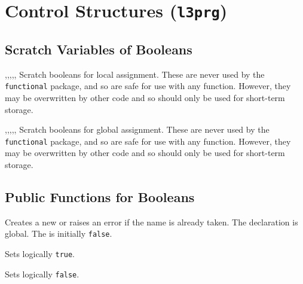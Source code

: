\documentclass[oneside]{book}
\begin{document}
\chapter{Control Structures (\texttt{l3prg})}

\section{Scratch Variables of Booleans}

\begin{variable}{\lTmpaBool,\lTmpbBool,\lTmpcBool,\lTmpiBool,\lTmpjBool,\lTmpkBool}
Scratch booleans for local assignment. These are never used by
the \verb!functional! package, and so are safe for use with any
function. However, they may be overwritten by other
code and so should only be used for short-term storage.
\end{variable}

\begin{variable}{\gTmpaBool,\gTmpbBool,\gTmpcBool,\gTmpiBool,\gTmpjBool,\gTmpkBool}
Scratch booleans for global assignment. These are never used by
the \verb!functional! package, and so are safe for use with any
function. However, they may be overwritten by other
code and so should only be used for short-term storage.
\end{variable}


\section{Public Functions for Booleans}

\begin{function}{\BoolNew}
\begin{syntax}
 
\end{syntax}
Creates a new  or raises an error if the
name is already taken. The declaration is global. The
 is initially \texttt{false}.
\end{function}

\begin{function}{\BoolSetTrue}
\begin{syntax}
 
\end{syntax}
Sets  logically \texttt{true}.
\end{function}

\begin{function}{\BoolSetFalse}
\begin{syntax}
 
\end{syntax}
Sets  logically \texttt{false}.
\end{function}
\end{document}
